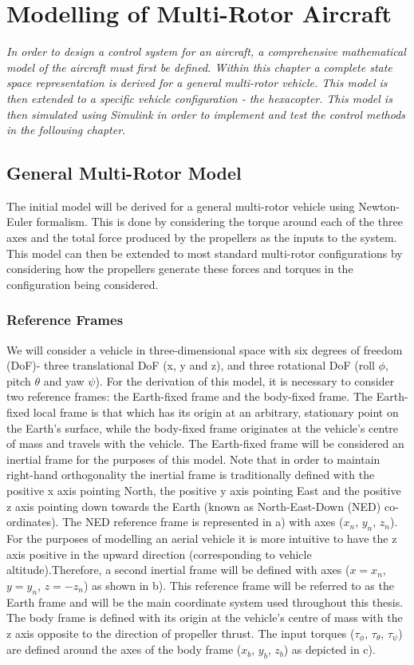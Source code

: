 
\chapter{Modelling of Multi-Rotor Aircraft}
\textit{In order to design a control system for an aircraft, a comprehensive mathematical model of the aircraft must first be defined. Within this chapter a complete state space representation is derived for a general multi-rotor vehicle. This model is then extended to a specific vehicle configuration - the hexacopter. This model is then simulated using Simulink in order to implement and test the control methods in the following chapter.}
\section{General Multi-Rotor Model}\label{section:MultiRotorModel}
The initial model will be derived for a general multi-rotor vehicle using Newton-Euler formalism. This is done by considering the torque around each of the three axes and the total force produced by the propellers as the inputs to the system. This model can then be extended to most standard multi-rotor configurations by considering how the propellers generate these forces and torques in the configuration being considered.


\subsection{Reference Frames}
We will consider a vehicle in three-dimensional space with six degrees of freedom (DoF)- three translational DoF (x, y and z), and three rotational DoF (roll $\phi$, pitch $\theta$ and yaw $\psi$). For the derivation of this model, it is necessary to consider two reference frames: the Earth-fixed frame and the body-fixed frame. The Earth-fixed local frame is that which has its origin at an arbitrary, stationary point on the Earth's surface, while the body-fixed frame originates at the vehicle's centre of mass and travels with the vehicle\cite{Nebylov2016}. The Earth-fixed frame will be considered an inertial frame for the purposes of this model. Note that in order to maintain right-hand orthogonality the inertial frame is traditionally defined with the positive x axis pointing North, the positive y axis pointing East and the positive z axis pointing down towards the Earth (known as North-East-Down (NED) co-ordinates). The NED reference frame is represented in  a) with axes ($x_{n}$, $y_{n}$, $z_{n}$). For the purposes of modelling an aerial vehicle it is more intuitive to have the z axis positive in the upward direction (corresponding to vehicle altitude).Therefore, a second inertial frame will be defined with axes ($x=x_{n}$, $y=y_{n}$, $z=-z_{n}$) as shown in  b). This reference frame will be referred to as the Earth frame and will be the main coordinate system used throughout this thesis. The body frame is defined with its origin at the vehicle's centre of mass with the z axis opposite to the direction of propeller thrust. The input torques ($\tau_{\phi}$, $\tau_{\theta}$, $\tau_{\psi}$) are defined around the axes of the body frame ($x_{b}$, $y_{b}$, $z_{b}$) as depicted in  c).\\


